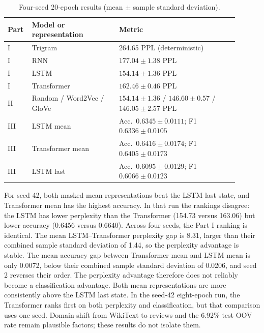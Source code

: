 \documentclass[11pt,a4paper]{article}
\begin{document}
\begin{table}[ht]
\centering
\footnotesize
\caption{Four-seed 20-epoch results (mean $\pm$ sample standard deviation).}
\begin{tabular}{p{0.07\linewidth}p{0.35\linewidth}p{0.48\linewidth}}
\toprule
Part & Model or representation & Metric \\
\midrule
I & Trigram & 264.65 PPL (deterministic) \\
I & RNN & $177.04 \pm 1.38$ PPL \\
I & LSTM & $\mathbf{154.14 \pm 1.36}$ PPL \\
I & Transformer & $162.46 \pm 0.46$ PPL \\
II & Random / Word2Vec / GloVe & $154.14\pm1.36$ / $146.60\pm0.57$ / $146.05\pm2.57$ PPL \\
III & LSTM mean & Acc.\ $0.6345\pm0.0111$; F1 $0.6336\pm0.0105$ \\
III & Transformer mean & Acc.\ $\mathbf{0.6416\pm0.0174}$; F1 $\mathbf{0.6405\pm0.0173}$ \\
III & LSTM last & Acc.\ $0.6095\pm0.0129$; F1 $0.6066\pm0.0123$ \\
\bottomrule
\end{tabular}
\label{tab:seeds}
\end{table}

For seed 42, both masked-mean representations beat the LSTM last state, and Transformer mean has
the highest accuracy. In that run the rankings disagree: the LSTM has lower perplexity than the
Transformer (154.73 versus 163.06) but lower accuracy (0.6456 versus 0.6640). Across four seeds,
the Part I ranking is identical. The mean LSTM--Transformer perplexity gap is 8.31, larger than
their combined sample standard deviation of 1.44, so the perplexity advantage is stable. The mean
accuracy gap between Transformer mean and LSTM mean is only 0.0072, below their combined sample
standard deviation of 0.0206, and seed 2 reverses their order. The perplexity advantage therefore
does not reliably become a classification advantage. Both mean representations are more
consistently above the LSTM last state. In the seed-42 eight-epoch run, the Transformer ranks
first on both perplexity and classification, but that comparison uses one seed. Domain shift from
WikiText to reviews and the 6.92\% test OOV rate remain plausible factors; these results do not
isolate them.
\end{document}

